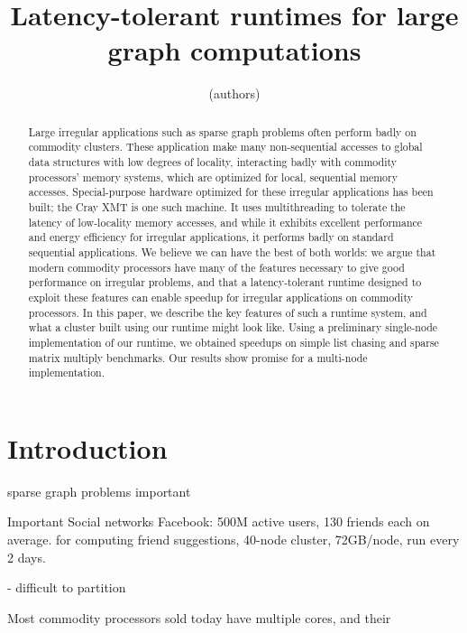 \documentclass{acm_proc_article-sp}
\begin{document}
\title{Latency-tolerant runtimes for large graph computations}

\author{
(authors)
}

\maketitle
\begin{abstract}

  Large irregular applications such as sparse graph problems often
  perform badly on commodity clusters. These application make many
  non-sequential accesses to global data structures with low degrees of
  locality, interacting badly with commodity processors' memory
  systems, which are optimized for local, sequential memory
  accesses. Special-purpose hardware optimized for these irregular
  applications has been built; the Cray XMT is one such machine. It
  uses multithreading to tolerate the latency of low-locality memory
  accesses, and while it exhibits excellent performance and energy
  efficiency for irregular applications, it performs badly on standard
  sequential applications. We believe we can have the best of both
  worlds: we argue that modern commodity processors have many of the
  features necessary to give good performance on irregular problems,
  and that a latency-tolerant runtime designed to exploit these
  features can enable speedup for irregular applications on commodity
  processors. In this paper, we describe the key features of such a
  runtime system, and what a cluster built using our runtime might
  look like. Using a preliminary single-node implementation of our
  runtime, we obtained speedups on simple list chasing and sparse
  matrix multiply benchmarks. Our results show promise for a
  multi-node implementation.

\end{abstract}

\section{Introduction}

sparse graph problems important

Important 
Social networks
Facebook: 500M active users, 130 friends each on average. for
computing friend suggestions, 40-node cluster, 72GB/node, run every 2
days.

- difficult to partition




Most commodity processors sold today have multiple cores, and their 
\end{document}
